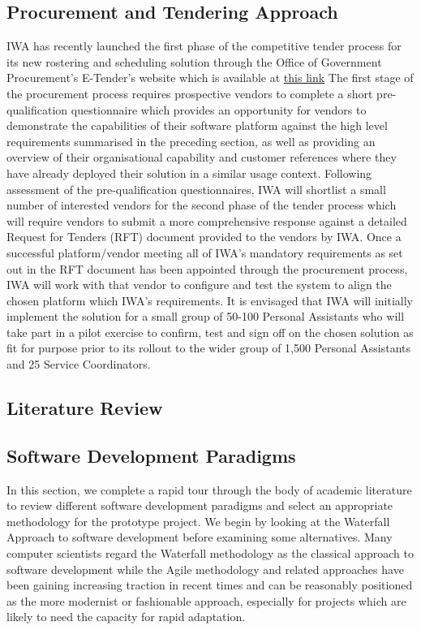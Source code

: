 \documentclass[a4paper,Times New Roman 11pt]{article}
\begin{document}
\begin{samepage}
\subsection {Procurement and Tendering Approach}
IWA has recently launched the first phase of the competitive tender process for its new rostering and scheduling solution through the Office of Government Procurement's E-Tender's website which is available at \href{https://irl.eu-supply.com/app/rfq/publicpurchase_frameset.asp?PID=110399&B=ETENDERS_SIMPLE&PS=1&PP=ctm/Supplier/publictenders}{this link}
The first stage of the procurement process requires prospective vendors to complete a short pre-qualification questionnaire which provides an opportunity for vendors to demonstrate the capabilities of their software platform against the high level requirements summarised in the preceding section, as well as providing an overview of their organisational capability and customer references where they have already deployed their solution in a similar usage context.  
Following assessment of the pre-qualification questionnaires, IWA will shortlist a small number of interested vendors for the second phase of the tender process which will require vendors to submit a more comprehensive response against a detailed Request for Tenders (RFT) document provided to the vendors by IWA. Once a successful platform/vendor meeting all of IWA's mandatory requirements as set out in the RFT document has been appointed through the procurement process, IWA will work with that vendor to configure and test the system to align the chosen platform which IWA's requirements. It is envisaged that IWA will initially implement the solution for a small group of 50-100 Personal Assistants who will take part in a pilot exercise to confirm, test and sign off on the chosen solution as fit for purpose prior to its rollout to the wider group of 1,500 Personal Assistants and 25 Service Coordinators.
\newpage
\begin{samepage}
\section {Literature Review}
\subsection{Software Development Paradigms}

In this section, we complete a rapid tour through the body of academic literature to review different software development paradigms and select an appropriate methodology for the prototype project. We begin by looking at the Waterfall Approach to software development before examining some alternatives. 
Many computer scientists regard the Waterfall methodology as the classical approach to software development while the Agile methodology and related approaches have been gaining increasing traction in recent times and can be reasonably positioned as the more modernist or fashionable approach, especially for projects which are likely to need the capacity for rapid adaptation.


\end{samepage}
\end{samepage}
\end{document}
